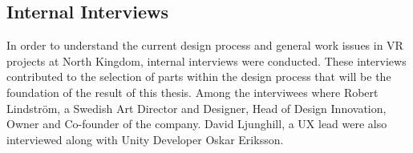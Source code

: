 \subsection{Internal Interviews}
In order to understand the current design process and general work issues in VR projects at North Kingdom, internal interviews were conducted. These interviews contributed to the selection of parts within the design process that will be the foundation of the result of this thesis. Among the interviwees where Robert Lindstr\"om, a Swedish Art Director and Designer, Head of Design Innovation, Owner and Co-founder of the company. David Ljunghill, a UX lead were also interviewed along with Unity Developer Oskar Eriksson.
